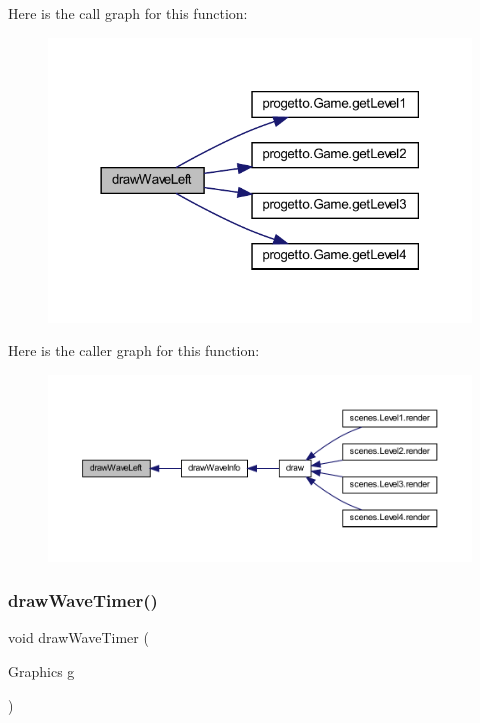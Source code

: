 Here is the call graph for this function\+:\nopagebreak
\begin{figure}[H]
\begin{center}
\leavevmode
\includegraphics[width=318pt]{classui_1_1_action_bar_aeb491734ea2c8ae2f1be9db4f930d22a_cgraph}
\end{center}
\end{figure}
Here is the caller graph for this function\+:\nopagebreak
\begin{figure}[H]
\begin{center}
\leavevmode
\includegraphics[width=350pt]{classui_1_1_action_bar_aeb491734ea2c8ae2f1be9db4f930d22a_icgraph}
\end{center}
\end{figure}
\mbox{\label{classui_1_1_action_bar_a01f37d59ae4977fa55a1a6dd3e8bd543}} 
\subsubsection{\texorpdfstring{draw\+Wave\+Timer()}{drawWaveTimer()}}
{\footnotesize\ttfamily void draw\+Wave\+Timer (\begin{DoxyParamCaption}\item[{Graphics}]{g }\end{DoxyParamCaption})\hspace{0.3cm}{\ttfamily [private]}}



